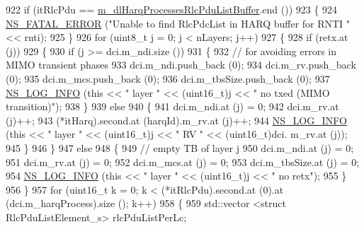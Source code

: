 \begin{DoxyCode}
922           \textcolor{keywordflow}{if} (itRlcPdu == \hyperlink{classns3_1_1TdBetFfMacScheduler_a066bceddaca3ed4a25974ada3aba3028}{m\_dlHarqProcessesRlcPduListBuffer}.end ())
923             \{
924               \hyperlink{group__fatal_ga5131d5e3f75d7d4cbfd706ac456fdc85}{NS\_FATAL\_ERROR} (\textcolor{stringliteral}{"Unable to find RlcPdcList in HARQ buffer for RNTI "} << rnti);
925             \}
926           \textcolor{keywordflow}{for} (uint8\_t j = 0; j < nLayers; j++)
927             \{
928               \textcolor{keywordflow}{if} (retx.at (j))
929                 \{
930                   \textcolor{keywordflow}{if} (j >= dci.m\_ndi.size ())
931                     \{
932                       \textcolor{comment}{// for avoiding errors in MIMO transient phases}
933                       dci.m\_ndi.push\_back (0);
934                       dci.m\_rv.push\_back (0);
935                       dci.m\_mcs.push\_back (0);
936                       dci.m\_tbsSize.push\_back (0);
937                       \hyperlink{group__logging_gafbd73ee2cf9f26b319f49086d8e860fb}{NS\_LOG\_INFO} (\textcolor{keyword}{this} << \textcolor{stringliteral}{" layer "} << (uint16\_t)j << \textcolor{stringliteral}{" no txed (MIMO
       transition)"});
938                     \}
939                   \textcolor{keywordflow}{else}
940                     \{
941                       dci.m\_ndi.at (j) = 0;
942                       dci.m\_rv.at (j)++;
943                       (*itHarq).second.at (harqId).m\_rv.at (j)++;
944                       \hyperlink{group__logging_gafbd73ee2cf9f26b319f49086d8e860fb}{NS\_LOG\_INFO} (\textcolor{keyword}{this} << \textcolor{stringliteral}{" layer "} << (uint16\_t)j << \textcolor{stringliteral}{" RV "} << (uint16\_t)dci.
      m\_rv.at (j));
945                     \}
946                 \}
947               \textcolor{keywordflow}{else}
948                 \{
949                   \textcolor{comment}{// empty TB of layer j}
950                   dci.m\_ndi.at (j) = 0;
951                   dci.m\_rv.at (j) = 0;
952                   dci.m\_mcs.at (j) = 0;
953                   dci.m\_tbsSize.at (j) = 0;
954                   \hyperlink{group__logging_gafbd73ee2cf9f26b319f49086d8e860fb}{NS\_LOG\_INFO} (\textcolor{keyword}{this} << \textcolor{stringliteral}{" layer "} << (uint16\_t)j << \textcolor{stringliteral}{" no retx"});
955                 \}
956             \}
957           \textcolor{keywordflow}{for} (uint16\_t k = 0; k < (*itRlcPdu).second.at (0).at (dci.m\_harqProcess).size (); k++)
958             \{
959               std::vector <struct RlcPduListElement\_s> rlcPduListPerLc;

\end{DoxyCode}
